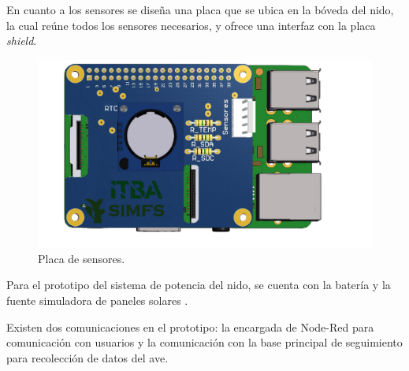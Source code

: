 En cuanto a los sensores se diseña una placa que se ubica en la bóveda del nido, la cual reúne todos los sensores necesarios, y ofrece una interfaz con la placa \textit{shield}.
\begin{figure}[H]
	\centering
	\includegraphics[width=0.9\linewidth,page=2]{ImagenesConstruccion del prototipo/shieldSensor}		
	\caption{Placa de sensores.}
	\label{fig:sens}
\end{figure}

Para el prototipo del sistema de potencia del nido, se cuenta con la batería \TBC y la fuente simuladora de paneles solares \TBC.

Existen dos comunicaciones en el prototipo: la encargada de Node-Red para comunicación con usuarios y la comunicación con la base principal de seguimiento para recolección de datos del ave.
